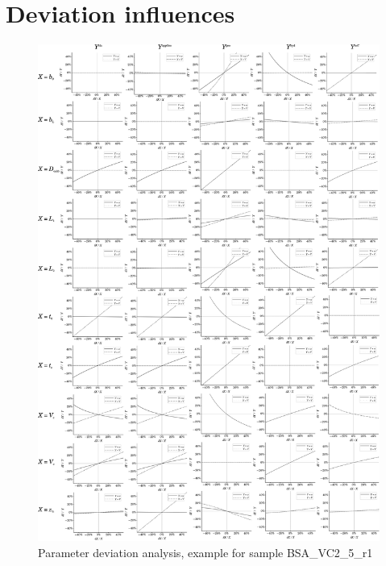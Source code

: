 \section*{Deviation influences}
\begin{figure}[H]
  \begin{center}
    \includegraphics[width=.925\linewidth]{./images/deltaAnalysis.pdf}
  \end{center}
  \vspace*{-3ex}
  \caption[Parameter deviation analysis, example for sample BSA\_VC2\_5\_r1]{Parameter deviation analysis, example for sample 
  BSA\_VC2\_5\_r1}
  \label{fig:DeviationAnalysis}
\end{figure}
\FloatBarrier
\restoregeometry
